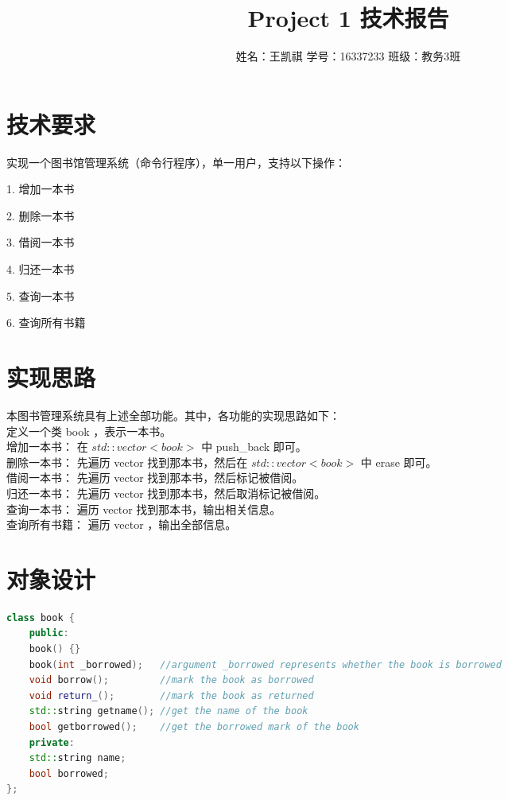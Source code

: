 \documentclass{article}
\begin{document}
\begin{CJK}{UTF8}{song}
\title{Project 1 技术报告}
\author {姓名：王凯祺 学号：16337233 班级：教务3班}
\maketitle

\section{技术要求}
实现一个图书馆管理系统（命令行程序），单一用户，支持以下操作：

1. 增加一本书

2. 删除一本书

3. 借阅一本书

4. 归还一本书

5. 查询一本书

6. 查询所有书籍

\section{实现思路}

本图书管理系统具有上述全部功能。其中，各功能的实现思路如下： \\
定义一个类 book ，表示一本书。 \\
增加一本书： 在 $std::vector<book>$ 中 push\_back 即可。 \\
删除一本书： 先遍历 vector 找到那本书，然后在 $std::vector<book>$ 中 erase 即可。 \\
借阅一本书： 先遍历 vector 找到那本书，然后标记被借阅。 \\
归还一本书： 先遍历 vector 找到那本书，然后取消标记被借阅。 \\
查询一本书： 遍历 vector 找到那本书，输出相关信息。 \\
查询所有书籍： 遍历 vector ，输出全部信息。

\section{对象设计}

\begin{lstlisting}[language=C++]
class book {
	public:
	book() {}
	book(int _borrowed);   //argument _borrowed represents whether the book is borrowed
	void borrow();         //mark the book as borrowed
	void return_();        //mark the book as returned
	std::string getname(); //get the name of the book
	bool getborrowed();    //get the borrowed mark of the book
	private:
	std::string name;
	bool borrowed;
};
\end{lstlisting}


\end{CJK}
\end{document}
